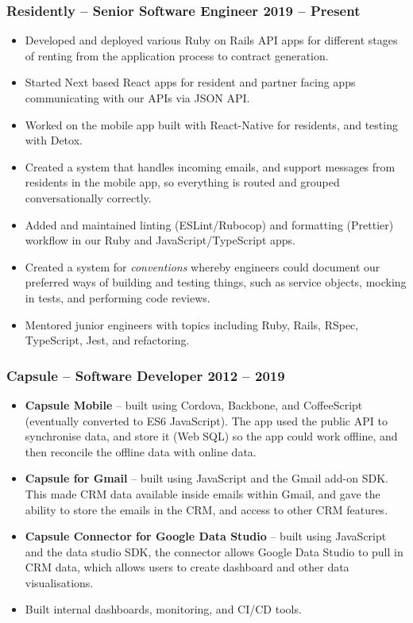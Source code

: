 \documentclass[a4paper]{article}
\newcommand{\datedsubsection}[2]{
  \subsubsection{#1 \hfill \textbf{#2}}
}
\begin{document}
\datedsubsection{\textbf{Residently} -- Senior Software Engineer}{2019 -- Present}
\begin{itemize}
  \item Developed and deployed various Ruby on Rails API apps for different
    stages of renting from the application process to contract generation.
  \item Started Next based React apps for resident and partner facing apps
    communicating with our APIs via JSON API.
  \item Worked on the mobile app built with React-Native for residents, and
    testing with Detox.
  \item Created a system that handles incoming emails, and support messages from
    residents in the mobile app, so everything is routed and grouped
    conversationally correctly.
  \item Added and maintained linting (ESLint/Rubocop) and formatting
    (Prettier) workflow in our Ruby and JavaScript/TypeScript apps.
  \item Created a system for \textit{conventions} whereby engineers could
    document our preferred ways of building and testing things, such as service
    objects, mocking in tests, and performing code reviews.
  \item Mentored junior engineers with topics including Ruby, Rails, RSpec,
    TypeScript, Jest, and refactoring.
\end{itemize}

\datedsubsection{\textbf{Capsule} -- Software Developer}{2012 -- 2019}
\begin{itemize}
  \item \textbf{Capsule Mobile} -- built using Cordova, Backbone, and
    CoffeeScript (eventually converted to ES6 JavaScript). The app used the
    public API to synchronise data, and store it (Web SQL) so the app could work
    offline, and then reconcile the offline data with online data.
  \item \textbf{Capsule for Gmail} -- built using JavaScript and the Gmail
    add-on SDK. This made CRM  data available inside emails within Gmail, and
    gave the ability to store the emails in the CRM, and access to other CRM
    features.
  \item \textbf{Capsule Connector for Google Data Studio} -- built using
    JavaScript and the data studio SDK, the connector allows Google Data Studio
    to pull in CRM data, which allows users to create dashboard and other data
    visualisations.
  \item Built internal dashboards, monitoring, and CI/CD tools.
\end{itemize}
\end{document}
